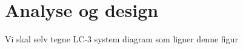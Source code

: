 \chapter{Analyse og design}\label{cha:analysedesign}

Vi skal selv tegne LC-3 system diagram som ligner denne figur

